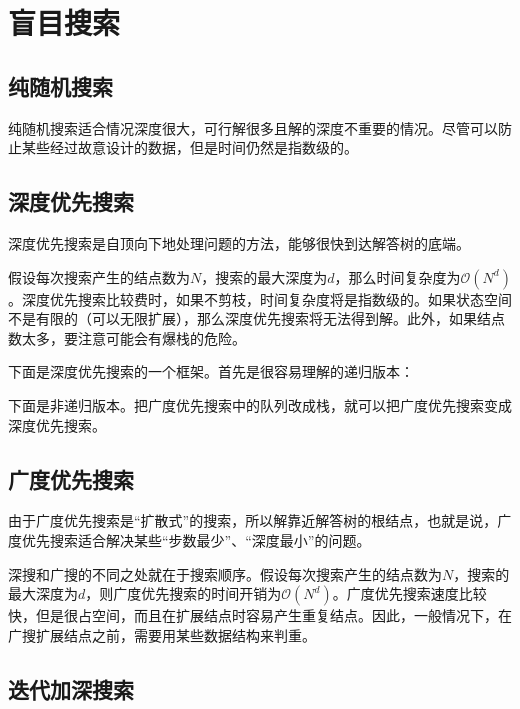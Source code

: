 \section{盲目搜索}

\subsection{纯随机搜索}

纯随机搜索适合情况深度很大，可行解很多且解的深度不重要的情况。尽管可以防止某些经过故意设计的数据，但是时间仍然是指数级的。

\subsection{深度优先搜索}

深度优先搜索是自顶向下地处理问题的方法，能够很快到达解答树的底端。

假设每次搜索产生的结点数为$N$，搜索的最大深度为$d$，那么时间复杂度为$\mathcal{O}(N^d)$。深度优先搜索比较费时，如果不剪枝，时间复杂度将是指数级的。如果状态空间不是有限的（可以无限扩展），那么深度优先搜索将无法得到解。此外，如果结点数太多，要注意可能会有爆栈的危险。

下面是深度优先搜索的一个框架。首先是很容易理解的递归版本：



下面是非递归版本。把广度优先搜索中的队列改成栈，就可以把广度优先搜索变成深度优先搜索。



\subsection{广度优先搜索}

由于广度优先搜索是“扩散式”的搜索，所以解靠近解答树的根结点，也就是说，广度优先搜索适合解决某些“步数最少”、“深度最小”的问题。

深搜和广搜的不同之处就在于搜索顺序。假设每次搜索产生的结点数为$N$，搜索的最大深度为$d$，则广度优先搜索的时间开销为$\mathcal{O}(N^d)$。广度优先搜索速度比较快，但是很占空间，而且在扩展结点时容易产生重复结点。因此，一般情况下，在广搜扩展结点之前，需要用某些数据结构来判重。



\subsection{迭代加深搜索}

